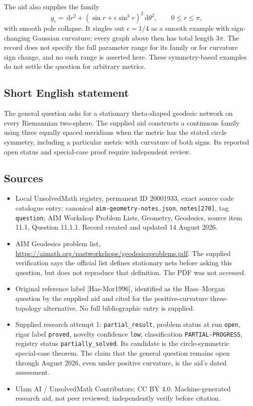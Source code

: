 \documentclass[11pt]{article}
\newcommand{\dd}{\,\mathrm{d}}
\begin{document}
The aid also supplies the family
\[
 g_\epsilon=\dd r^2+(\sin r+\epsilon\sin^3r)^2\dd\theta^2,
 \qquad 0\le r\le\pi,
\]
with smooth pole collapse. It singles out \(\epsilon=1/4\) as a smooth example with sign-changing Gaussian curvature; every graph above then has total length \(3\pi\). The record does not specify the full parameter range for its family or for curvature sign change, and no such range is asserted here. These symmetry-based examples do not settle the question for arbitrary metrics.
\subsection{Short English statement}
The general question asks for a stationary theta-shaped geodesic network on every Riemannian two-sphere. The supplied aid constructs a continuous family using three equally spaced meridians when the metric has the stated circle symmetry, including a particular metric with curvature of both signs. Its reported open status and special-case proof require independent review.
\subsection{Sources}
\begin{itemize}
\item Local UnsolvedMath registry, permanent ID 20001933, exact source code catalogue entry; canonical \texttt{aim-geometry-notes.json}, \texttt{notes[270]}, tag \texttt{question}; AIM Workshop Problem Lists, Geometry, Geodesics, source item 11.1, Question 11.1.1. Record created and updated 14 August 2026.
\item AIM Geodesics problem list, \url{https://aimath.org/pastworkshops/geodesicsproblems.pdf}. The supplied verification says the official list defines stationary nets before asking this question, but does not reproduce that definition. The PDF was not accessed.
\item Original reference label [Has-Mor1996], identified as the Hass--Morgan question by the supplied aid and cited for the positive-curvature three-topology alternative. No full bibliographic entry is supplied.
\item Supplied research attempt 1: \texttt{partial\_result}, problem status at run \texttt{open}, rigor label \texttt{proved}, novelty confidence \texttt{low}; classification \texttt{PARTIAL-PROGRESS}, registry status \texttt{partially\_solved}. Its candidate is the circle-symmetric special-case theorem. The claim that the general question remains open through August 2026, even under positive curvature, is the aid's dated assessment.
\item Ulam AI / UnsolvedMath Contributors; CC BY 4.0. Machine-generated research aid, not peer reviewed; independently verify before citation.
\end{itemize}
\end{document}
